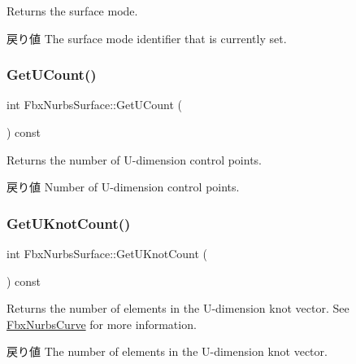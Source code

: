 Returns the surface mode. \begin{DoxyReturn}{戻り値}
The surface mode identifier that is currently set. 
\end{DoxyReturn}
\mbox{\label{class_fbx_nurbs_surface_aed399de214fdd1f387289428626df0da}} 
\subsubsection{\texorpdfstring{Get\+U\+Count()}{GetUCount()}}
{\footnotesize\ttfamily int Fbx\+Nurbs\+Surface\+::\+Get\+U\+Count (\begin{DoxyParamCaption}{ }\end{DoxyParamCaption}) const}

Returns the number of U-\/dimension control points. \begin{DoxyReturn}{戻り値}
Number of U-\/dimension control points. 
\end{DoxyReturn}
\mbox{\label{class_fbx_nurbs_surface_adc42200550501843d8a31b9a3d895337}} 
\subsubsection{\texorpdfstring{Get\+U\+Knot\+Count()}{GetUKnotCount()}}
{\footnotesize\ttfamily int Fbx\+Nurbs\+Surface\+::\+Get\+U\+Knot\+Count (\begin{DoxyParamCaption}{ }\end{DoxyParamCaption}) const}

Returns the number of elements in the U-\/dimension knot vector. See \hyperlink{class_fbx_nurbs_curve}{Fbx\+Nurbs\+Curve} for more information. \begin{DoxyReturn}{戻り値}
The number of elements in the U-\/dimension knot vector. 
\end{DoxyReturn}
\mbox{\label{class_fbx_nurbs_surface_a34c4fa7619bbd3293074929f14d1ae42}} 
